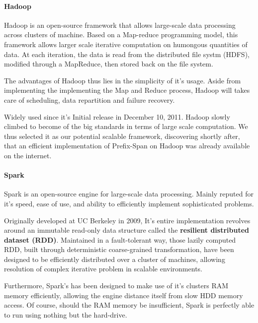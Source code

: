 \documentclass{eplmastersthesis}
\begin{document}
\paragraph{Hadoop}

Hadoop is an open-source framework that allows large-scale data processing across clusters of machine. Based on a Map-reduce programming model, this framework allows larger scale iterative computation on humongous quantities of data. At each iteration, the data is read from the distributed file systm (HDFS), modified through a MapReduce, then stored back on the file system. \newline

The advantages of Hadoop thus lies in the simplicity of it's usage. Aside from implementing the implementing the Map and Reduce process, Hadoop will takes care of scheduling, data repartition and failure recovery. \newline

Widely used since it's Initial release in December 10, 2011. Hadoop slowly climbed to become of the big standards in terms of large scale computation. We thus selected it as our potential scalable framework, discovering shortly after, that an efficient implementation of Prefix-Span on Hadoop was already available on the internet.

\paragraph{Spark}

Spark is an open-source engine for large-scale data processing. Mainly reputed for it's speed, ease of use, and ability to efficiently implement sophisticated problems. \newline

Originally developed at UC Berkeley in 2009, It's entire implementation revolves around an immutable read-only data structure called the \textbf{resilient distributed dataset (RDD)}. Maintained in a fault-tolerant way, those lazily computed RDD, built through deterministic coarse-grained transformation, have been designed to be efficiently distributed over a cluster of machines, allowing resolution of complex iterative problem in scalable environments. \newline

Furthermore, Spark's has been designed to make use of it's clusters RAM memory efficiently, allowing the engine distance itself from slow HDD memory access. Of course, should the RAM memory be insufficient, Spark is perfectly able to run using nothing but the hard-drive. \newline
\end{document}
